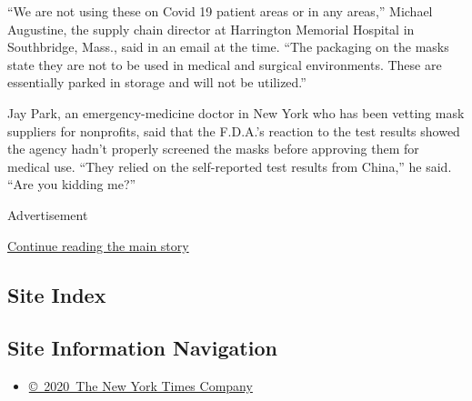 ``We are not using these on Covid 19 patient areas or in any areas,''
Michael Augustine, the supply chain director at Harrington Memorial
Hospital in Southbridge, Mass., said in an email at the time. ``The
packaging on the masks state they are not to be used in medical and
surgical environments. These are essentially parked in storage and will
not be utilized.''

Jay Park, an emergency-medicine doctor in New York who has been vetting
mask suppliers for nonprofits, said that the F.D.A.'s reaction to the
test results showed the agency hadn't properly screened the masks before
approving them for medical use. ``They relied on the self-reported test
results from China,'' he said. ``Are you kidding me?''

Advertisement

\protect\hyperlink{after-bottom}{Continue reading the main story}

\hypertarget{site-index}{%
\subsection{Site Index}\label{site-index}}

\hypertarget{site-information-navigation}{%
\subsection{Site Information
Navigation}\label{site-information-navigation}}

\begin{itemize}
\tightlist
\item
  \href{https://help.nytimes3xbfgragh.onion/hc/en-us/articles/115014792127-Copyright-notice}{©~2020~The
  New York Times Company}
\end{itemize}

